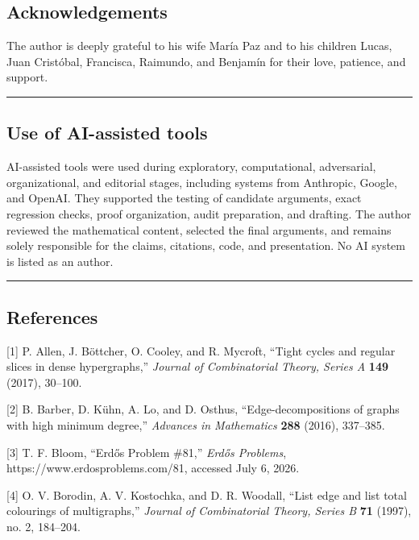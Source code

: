 \documentclass[
  american,
  11pt,
  a4paper,
]{article}
\begin{document}
\subsection{Acknowledgements}\label{acknowledgements}

The author is deeply grateful to his wife María Paz and to his children Lucas, Juan Cristóbal, Francisca, Raimundo, and Benjamín for their love, patience, and support.

\begin{center}\rule{0.5\linewidth}{0.5pt}\end{center}

\subsection{Use of AI-assisted tools}\label{use-of-ai-assisted-tools}

AI-assisted tools were used during exploratory, computational, adversarial, organizational, and editorial stages, including systems from Anthropic, Google, and OpenAI. They supported the testing of candidate arguments, exact regression checks, proof organization, audit preparation, and drafting. The author reviewed the mathematical content, selected the final arguments, and remains solely responsible for the claims, citations, code, and presentation. No AI system is listed as an author.

\begin{center}\rule{0.5\linewidth}{0.5pt}\end{center}

\begingroup
\setlength{\parskip}{2pt plus 1pt minus 1pt}
\subsection{References}\label{references}

{[}1{]} P. Allen, J. Böttcher, O. Cooley, and R. Mycroft, ``Tight cycles and regular slices in dense hypergraphs,'' \emph{Journal of Combinatorial Theory, Series A} \textbf{149} (2017), 30--100.

{[}2{]} B. Barber, D. Kühn, A. Lo, and D. Osthus, ``Edge-decompositions of graphs with high minimum degree,'' \emph{Advances in Mathematics} \textbf{288} (2016), 337--385.

{[}3{]} T. F. Bloom, ``Erdős Problem \#81,'' \emph{Erdős Problems}, https://www.erdosproblems.com/81, accessed July 6, 2026.

{[}4{]} O. V. Borodin, A. V. Kostochka, and D. R. Woodall, ``List edge and list total colourings of multigraphs,'' \emph{Journal of Combinatorial Theory, Series B} \textbf{71} (1997), no. 2, 184--204.
\end{document}
